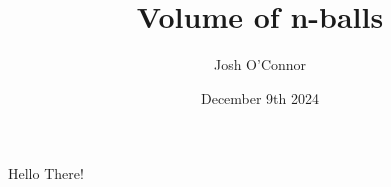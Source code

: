 \documentclass{article}
\title{Volume of n-balls}
\author{Josh O'Connor}
\date{December 9th 2024}
\begin{document}
Hello There!
\end{document}
